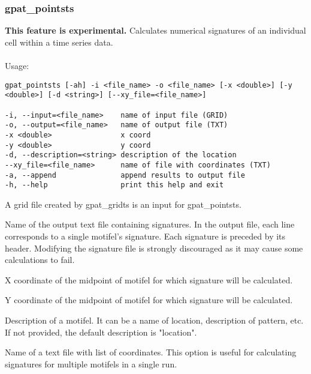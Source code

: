 \subsubsection{gpat\_pointsts}

\textbf{This feature is experimental.}
Calculates numerical signatures of an individual cell within a time series data.
\\\\
Usage:

\begin{minipage}{\linewidth}
\begin{lstlisting}
gpat_pointsts [-ah] -i <file_name> -o <file_name> [-x <double>] [-y <double>] [-d <string>] [--xy_file=<file_name>]

-i, --input=<file_name>    name of input file (GRID)
-o, --output=<file_name>   name of output file (TXT)
-x <double>                x coord
-y <double>                y coord
-d, --description=<string> description of the location
--xy_file=<file_name>      name of file with coordinates (TXT)
-a, --append               append results to output file
-h, --help                 print this help and exit
\end{lstlisting}
\end{minipage}


A grid file created by gpat\_gridts is an input for gpat\_pointsts.


Name of the output text file containing signatures.
In the output file, each line corresponds to a single motifel’s signature. 
Each signature is preceded by its header. 
Modifying the signature file is strongly discouraged as it may cause some calculations to fail.


X coordinate of the midpoint of motifel for which signature will be calculated.


Y coordinate of the midpoint of motifel for which signature will be calculated.


Description of a motifel.
It can be a name of location, description of pattern, etc. 
If not provided, the default description is "location".


Name of a text file with list of coordinates. 
This option is useful for calculating signatures for multiple motifels in a single run. 

